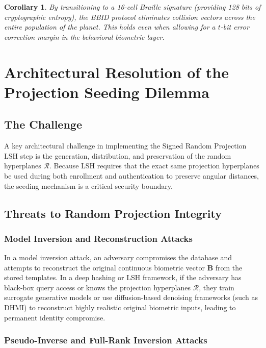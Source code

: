 \documentclass[11pt,twoside]{amsart}
\theoremstyle{plain}
\newtheorem{corollary}[theorem]{Corollary}
\theoremstyle{definition}
\theoremstyle{remark}
\newcommand{\bB}{\mathbf{B}}
\newcommand{\calR}{\mathcal{R}}
\begin{document}
\begin{corollary}
By transitioning to a 16-cell Braille signature (providing 128 bits of cryptographic entropy), the BBID protocol eliminates collision vectors across the entire population of the planet. This holds even when allowing for a $t$-bit error correction margin in the behavioral biometric layer.
\end{corollary}

\section{Architectural Resolution of the Projection Seeding Dilemma}

\subsection{The Challenge}

A key architectural challenge in implementing the Signed Random Projection LSH step is the generation, distribution, and preservation of the random hyperplanes $\calR$. Because LSH requires that the exact same projection hyperplanes be used during both enrollment and authentication to preserve angular distances, the seeding mechanism is a critical security boundary.

\subsection{Threats to Random Projection Integrity}

\subsubsection{Model Inversion and Reconstruction Attacks}

In a model inversion attack, an adversary compromises the database and attempts to reconstruct the original continuous biometric vector $\bB$ from the stored templates. In a deep hashing or LSH framework, if the adversary has black-box query access or knows the projection hyperplanes $\calR$, they train surrogate generative models or use diffusion-based denoising frameworks (such as DHMI) to reconstruct highly realistic original biometric inputs, leading to permanent identity compromise.

\subsubsection{Pseudo-Inverse and Full-Rank Inversion Attacks}
\end{document}
